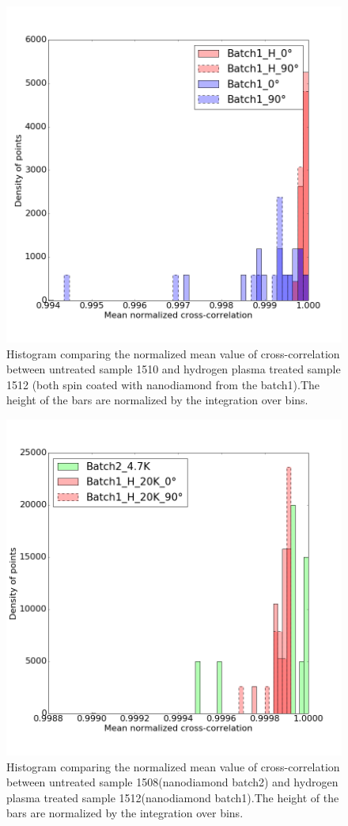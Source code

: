 \begin{figure}[h]
\centering
\includegraphics[width=0.7\linewidth]{"Figures/pic/Histogram of normalized cross-correlation_1_H"}
\caption{Histogram comparing the normalized mean value of cross-correlation between untreated sample 1510 and hydrogen plasma treated sample 1512 (both spin coated with nanodiamond from the batch1).The height of the bars are normalized by the integration over bins.  }
\label{fig:histogram-of-normalized-cross-correlation1h}
\end{figure}

\begin{figure}[h]
\centering
\includegraphics[width=0.7\linewidth]{"Figures/pic/Histogram of normalized cross-correlation_1_H_2"}
\caption{Histogram comparing the normalized mean value of cross-correlation between untreated sample 1508(nanodiamond batch2) and hydrogen plasma treated sample 1512(nanodiamond batch1).The height of the bars are normalized by the integration over bins.  }
\label{fig:histogram-of-normalized-cross-correlation1h2}
\end{figure}


